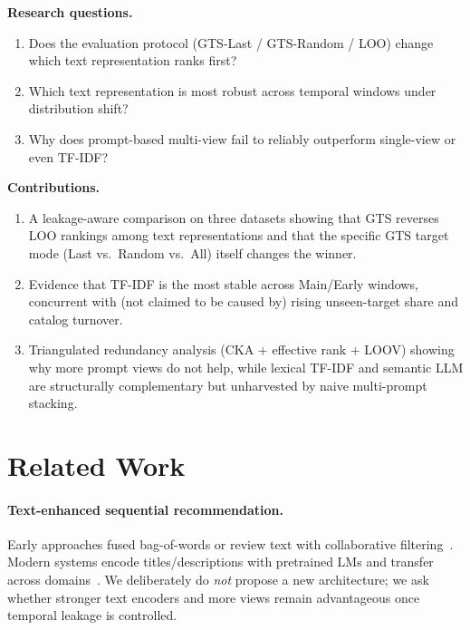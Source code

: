\documentclass[sigconf,natbib=true,anonymous]{acmart}
\newcommand{\tfidf}{\textsc{TF-IDF}\xspace}
\newcommand{\llm}{\textsc{LLM}\xspace}
\begin{document}
\noindent\textbf{Research questions.}
\begin{enumerate}[leftmargin=*,itemsep=1pt]
\item[\textbf{RQ1}] Does the evaluation protocol (GTS-Last / GTS-Random / LOO) change which text representation ranks first?
\item[\textbf{RQ2}] Which text representation is most robust across temporal windows under distribution shift?
\item[\textbf{RQ3}] Why does prompt-based multi-view fail to reliably outperform single-view or even \tfidf?
\end{enumerate}

\noindent\textbf{Contributions.}
\begin{enumerate}[leftmargin=*,itemsep=1pt]
\item A leakage-aware comparison on three datasets showing that GTS reverses LOO rankings among text representations and that the specific GTS target mode (Last vs.\ Random vs.\ All) itself changes the winner.
\item Evidence that \tfidf is the most stable across Main/Early windows, concurrent with (not claimed to be caused by) rising unseen-target share and catalog turnover.
\item Triangulated redundancy analysis (CKA + effective rank + LOOV) showing why more prompt views do not help, while lexical \tfidf and semantic \llm are structurally complementary but unharvested by naive multi-prompt stacking.
\end{enumerate}

\section{Related Work}
\label{sec:related}

\paragraph{Text-enhanced sequential recommendation.}
Early approaches fused bag-of-words or review text with collaborative filtering~\cite{wang2015cdl,salton1988termweighting}.
Modern systems encode titles/descriptions with pretrained LMs and transfer across domains~\cite{hou2022unisrec,hou2023vqrec,geng2022p5,bao2023tallrec}.
We deliberately do \emph{not} propose a new architecture; we ask whether stronger text encoders and more views remain advantageous once temporal leakage is controlled.
\end{document}
